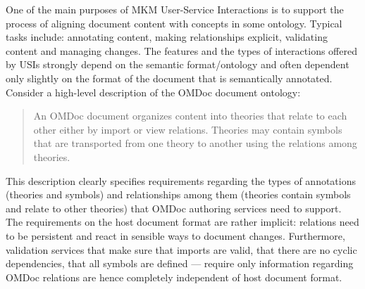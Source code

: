 \documentclass{llncs}
\begin{document}
One of the main purposes of MKM User-Service Interactions is to support the process of aligning document content with concepts in some ontology. Typical tasks include: annotating content, making relationships explicit, validating content and managing changes. The features and the types of interactions offered by USIs strongly depend on the semantic format/ontology and often dependent only slightly on the format of the document that is semantically annotated. Consider a high-level description of the OMDoc document ontology: 
\begin{quote}
An OMDoc document organizes content into theories that relate to each other either by import or view relations. Theories may contain symbols that are transported from one theory to another using the relations among theories. 
\end{quote}
This description clearly specifies requirements regarding the types of annotations (theories and symbols) and relationships among them (theories contain symbols and relate to other theories) that OMDoc authoring services need to support. The requirements on the host document format are rather implicit: relations need to be persistent and react in sensible ways to document changes. Furthermore, validation services that make sure that imports are valid, that there are no cyclic dependencies, that all symbols are defined --- require only information regarding OMDoc relations are hence completely independent of host document format. 
\end{document}
